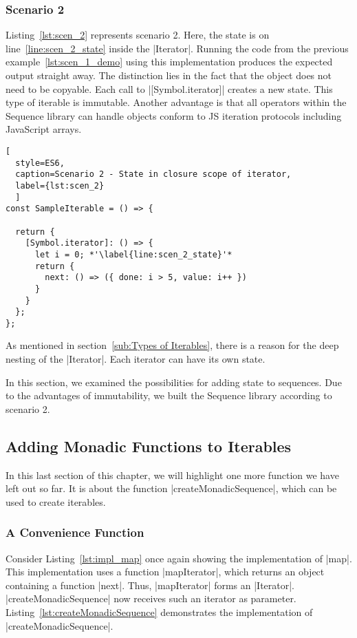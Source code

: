 \subsubsection{Scenario 2}
\label{subsub:Scenario 2}
Listing~\ref{lst:scen_2} represents scenario 2. Here, the state is on
line~\ref{line:scen_2_state} inside the |Iterator|. Running the code from the
previous example~\ref{lst:scen_1_demo} using this implementation produces the
expected output straight away. The distinction lies in the fact that the object
does not need to be copyable. Each call to |[Symbol.iterator]| creates a new
state. This type of iterable is immutable. Another advantage is that all
operators within the Sequence library can handle objects conform to JS
iteration protocols including JavaScript arrays.

\begin{lstlisting}[
  style=ES6, 
  caption=Scenario 2 - State in closure scope of iterator,
  label={lst:scen_2}
  ]
const SampleIterable = () => {

  return {
    [Symbol.iterator]: () => {
      let i = 0; *'\label{line:scen_2_state}'*
      return {
        next: () => ({ done: i > 5, value: i++ })
      }
    }
  };
};
\end{lstlisting}

As mentioned in section~\ref{sub:Types of Iterables}, there is a reason for 
the deep nesting of the |Iterator|. Each iterator can have its own state.

In this section, we examined the possibilities for adding state to 
sequences. Due to the advantages of immutability, we built the Sequence library 
according to scenario 2.


\subsection{Adding Monadic Functions to Iterables}
\label{sub:Adding Monadic Functions to Iterables}
In this last section of this chapter, we will highlight one more function we 
have left out so far. It is about the function |createMonadicSequence|, which
can be used to create iterables.

\subsubsection{A Convenience Function}
\label{subsub:A Convenience Function}
Consider Listing~\ref{lst:impl_map} once again showing the implementation of
|map|. This implementation uses a function |mapIterator|, which returns an
object containing a function |next|. Thus, |mapIterator| forms an |Iterator|.
|createMonadicSequence| now receives such an iterator as parameter.
Listing~\ref{lst:createMonadicSequence} demonstrates the implementation of
|createMonadicSequence|.

